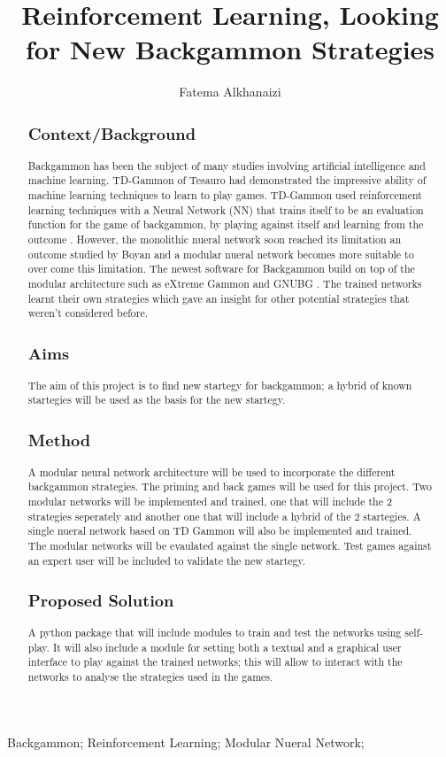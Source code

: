 \documentclass[12pt,a4paper]{article}
\title{Reinforcement Learning, Looking for New Backgammon Strategies}
\author{Fatema Alkhanaizi}
\date{}
\begin{document}
\maketitle

\begin{abstract}
\subsection{Context/Background}
Backgammon has been the subject of many studies involving artificial intelligence and machine learning. TD-Gammon  of Tesauro \cite{} had demonstrated the impressive ability of machine learning techniques to learn to play games. TD-Gammon used reinforcement learning techniques with a Neural Network (NN) that trains itself to be an evaluation function for the game of backgammon, by playing against itself and learning from the outcome \cite{}. However, the monolithic nueral network soon reached its limitation an outcome studied by Boyan \cite{} and a modular nueral network becomes more suitable to over come this limitation. The newest software for Backgammon build on top of the modular architecture such as eXtreme Gammon \cite{} and GNUBG \cite{}. The trained networks learnt their own strategies which gave an insight for other potential strategies that weren't considered before.
\subsection{Aims}
The aim of this project is to find new startegy for backgammon; a hybrid of known startegies will be used as the basis for the new startegy. 
\subsection{Method}
A modular neural network architecture will be used to incorporate the different backgammon strategies. The priming and back games will be used for this project. Two modular networks will be implemented and trained, one that will include the 2 strategies seperately and another one that will include a hybrid of the 2 startegies. A single nueral network based on TD Gammon will also be implemented and trained. The modular networks will be evaulated against the single network. Test games against an expert user will be included to validate the new startegy.
\subsection{Proposed Solution}
A python package that will include modules to train and test the networks using self-play. It will also include a module for setting both a textual and a graphical user interface to play against the trained networks; this will allow to interact with the networks to analyse the strategies used in the games. 

\end{abstract}
\begin{keywords}
Backgammon; Reinforcement Learning; Modular Nueral Network; 
\end{keywords}
\end{document}
